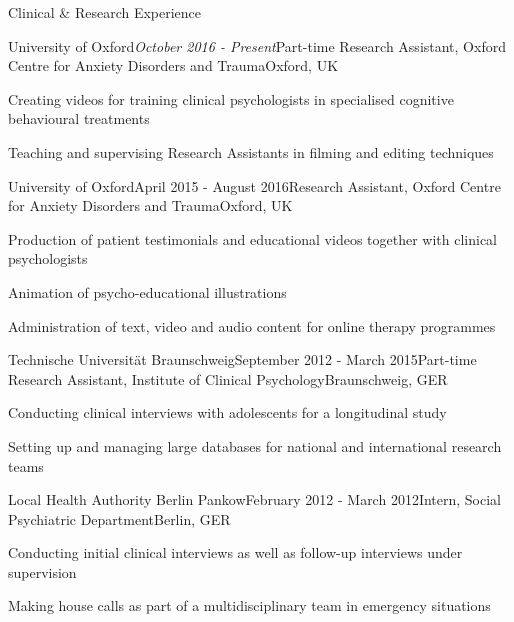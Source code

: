 \documentclass{resume} %
\begin{document}

\begin{rSection}{Clinical \& Research Experience}

\begin{rSubsection}{University of Oxford}{\em October 2016 - Present}{Part-time Research Assistant, Oxford Centre for Anxiety Disorders and Trauma}{Oxford, UK}
\item Creating videos for training clinical psychologists in specialised cognitive behavioural treatments
\item Teaching and supervising Research Assistants in filming and editing techniques
\end{rSubsection}

\begin{rSubsection}{University of Oxford}{April 2015 - August 2016}{Research Assistant, Oxford Centre for Anxiety Disorders and Trauma}{Oxford, UK}
\item Production of patient testimonials and educational videos together with clinical psychologists
\item Animation of psycho-educational illustrations
\item Administration of text, video and audio content for online therapy programmes
\end{rSubsection}

\begin{rSubsection}{Technische Universit{\"a}t Braunschweig}{September 2012 - March 2015}{Part-time Research Assistant, Institute of Clinical Psychology}{Braunschweig, GER}
\item Conducting clinical interviews with adolescents for a longitudinal study
\item Setting up and managing large databases for national and international research teams
\end{rSubsection}

\begin{rSubsection}{Local Health Authority Berlin Pankow}{February 2012 - March 2012}{Intern, Social Psychiatric Department}{Berlin, GER}
\item Conducting initial clinical interviews as well as follow-up interviews under supervision
\item Making house calls as part of a multidisciplinary team in emergency situations

\end{rSubsection}

\end{rSection}
\end{document}
